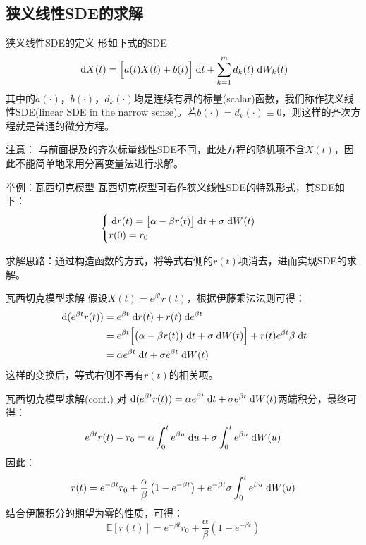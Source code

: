 \documentclass[t]{beamer}
\newcommand{\dif}{{\;\rm d}}
\newcommand{\E}{\mathbb{E}}
\begin{document}
\subsection{狭义线性SDE的求解}
\begin{frame}{狭义线性SDE的定义}
形如下式的SDE
$$\dif X(t)=\Big[a(t)X(t)+b(t)\Big]\dif t+\sum^m_{k=1} d_k(t) \dif W_k(t)$$
其中的$a(\cdot)$，$b(\cdot)$，$d_k(\cdot )$均是连续有界的标量(scalar)函数，我们称作狭义线性SDE(linear SDE in the narrow sense)。若$b(\cdot)=d_k(\cdot)\equiv 0$，则这样的齐次方程就是普通的微分方程。

\begin{block}{注意：}
与前面提及的齐次标量线性SDE不同，此处方程的随机项不含$X(t)$，因此不能简单地采用分离变量法进行求解。
\end{block}
\end{frame}

\begin{frame}{举例：瓦西切克模型}
瓦西切克模型可看作狭义线性SDE的特殊形式，其SDE如下：
\[\begin{cases}
\dif r(t)=\big[\alpha-\beta r(t)\big]\dif t+\sigma \dif W(t) \\
r(0)=r_0
\end{cases}\]

求解思路：通过构造函数的方式，将等式右侧的$r(t)$项消去，进而实现SDE的求解。
\end{frame}

\begin{frame}{瓦西切克模型求解}
假设$X(t)=e^{\beta t} r(t)$，根据伊藤乘法法则可得：
\[\begin{split}
\dif (e^{\beta t} r(t))&=e^{\beta t} \dif r(t)+  r(t)\dif e^{\beta t}\\
&=e^{\beta t}\Big[\big(\alpha-\beta r(t)\big)\dif t+\sigma \dif W(t)\Big]+r(t)e^{\beta t}\beta\dif t\\
&=\alpha e^{\beta t} \dif t+\sigma e^{\beta t}\dif W(t)
\end{split} \]
这样的变换后，等式右侧不再有$r(t)$的相关项。

\end{frame}

\begin{frame}{瓦西切克模型求解(cont.)}
对$\dif (e^{\beta t} r(t))=\alpha e^{\beta t} \dif t+\sigma e^{\beta t}\dif W(t)$两端积分，最终可得：
\[e^{\beta t}r(t)-r_0=\alpha \int^t_0 e^{\beta u}\dif u+\sigma\int_{0}^t e^{\beta u}\dif W(u)\]因此：
\[r(t)=e^{-\beta t}r_0+\frac{\alpha}{\beta}\left(1- e^{-\beta t}\right)+ e^{-\beta t}\sigma\int_{0}^t e^{\beta u}\dif W(u) \]
结合伊藤积分的期望为零的性质，可得：
\[\E[r(t)]=e^{-\beta t}r_0+\frac{\alpha}{\beta}\left(1- e^{-\beta t}\right) \]
\end{frame}
\end{document}
